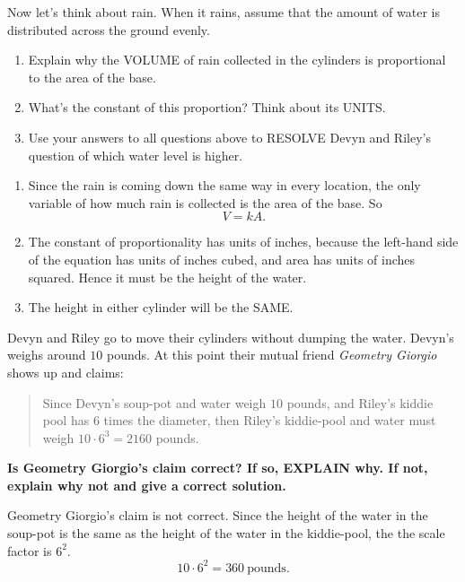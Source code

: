 \documentclass[nooutcomes,noauthor,hints,handout]{ximera}
\begin{document}
\begin{question}
  Now let's think about rain. When it rains, assume that the amount of
  water is distributed across the ground evenly.
  \begin{enumerate}
  \item Explain why the VOLUME of rain collected in the cylinders is
    proportional to the area of the base.
  \item What's the constant of this proportion? Think about its UNITS.
  \item Use your answers to all questions above to RESOLVE Devyn and
    Riley's question of which water level is higher.
  \end{enumerate}
  \begin{freeResponse}
    \begin{enumerate}
    \item Since the rain is coming down the same way in every
      location, the only variable of how much rain is collected is the
      area of the base. So
      \[
      V= k A.
      \]
    \item The constant of proportionality has units of inches, because
      the left-hand side of the equation has units of inches cubed,
      and area has units of inches squared. Hence it must be the height
      of the water.
    \item The height in either cylinder will be the SAME. 
    \end{enumerate}
  \end{freeResponse}
\end{question}
\mynewpage



\begin{question}
  Devyn and Riley go to move their cylinders without dumping the
  water. Devyn's weighs around $10$ pounds. At this point their mutual
  friend \textit{Geometry Giorgio} shows up and claims:
  \begin{quote}
    Since Devyn's soup-pot and water weigh $10$ pounds, and Riley's
    kiddie pool has $6$ times the diameter, then Riley's kiddie-pool
    and water must weigh $10\cdot 6^3 = 2160$ pounds.
  \end{quote}
  \textbf{Is Geometry Giorgio’s claim correct?  If so, EXPLAIN why. If
    not, explain why not and give a correct solution.}
  \begin{freeResponse}
    Geometry Giorgio’s claim is not correct. Since the height of the
    water in the soup-pot is the same as the height of the water in
    the kiddie-pool, the the scale factor is $6^2$.
    \[
    10\cdot 6^2=360~\text{pounds}.
    \]
  \end{freeResponse}
\end{question}
\end{document}
